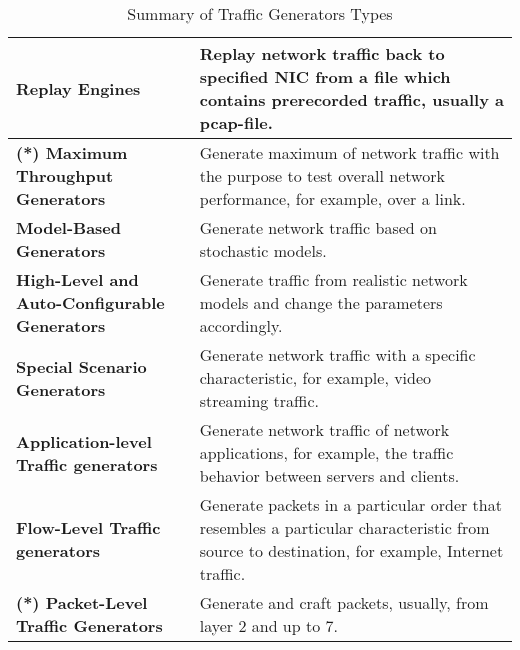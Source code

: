\begin{table}[ht!]
    \scriptsize
    \caption{Summary of Traffic Generators Types}
    \label{types}
    \begin{adjustbox}{center}
        \renewcommand*\arraystretch{1.0}\begin{tabular}{| L{4cm} | L{7cm} |}
            \hline
            \textbf{Replay Engines} & Replay network traffic back to specified NIC from a file which contains prerecorded traffic, usually a pcap-file.
            \\ \hline
            \textbf{(*) Maximum Throughput Generators} & Generate maximum of network traffic with the purpose to test overall network performance, for example, over a link.
            \\ \hline
            \textbf{Model-Based Generators} & Generate network traffic based on stochastic models.
            \\ \hline
            \textbf{High-Level and Auto-Configurable Generators} & Generate traffic from realistic network models and change the parameters accordingly.
            \\ \hline
            \textbf{Special Scenario Generators} & Generate network traffic with a specific characteristic, for example, video streaming traffic.
            \\ \hline \hline
            \textbf{Application-level Traffic generators} & Generate network traffic of network applications, for example, the traffic behavior between servers and clients.
            \\ \hline
            \textbf{Flow-Level Traffic generators} & Generate packets in a particular order that resembles a particular characteristic from source to destination, for example, Internet traffic.
            \\ \hline
            \textbf{(*) Packet-Level Traffic Generators} & Generate and craft packets, usually, from layer 2 and up to 7.
            \\ \hline
        \end{tabular}
    \end{adjustbox}
\end{table}
